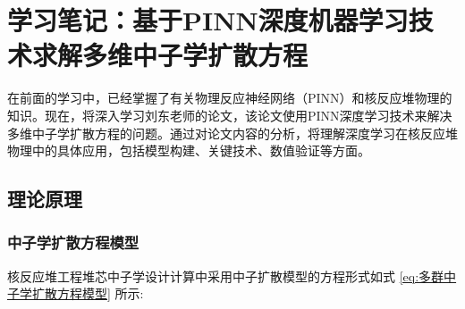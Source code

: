 \documentclass{Sichuan Normal University}
\begin{document}
\section{学习笔记：基于PINN深度机器学习技术求解多维中子学扩散方程}
在前面的学习中，已经掌握了有关物理反应神经网络（PINN）和核反应堆物理的知识。现在，将深入学习刘东老师的论文，该论文使用PINN深度学习技术来解决多维中子学扩散方程的问题。通过对论文内容的分析，将理解深度学习在核反应堆物理中的具体应用，包括模型构建、关键技术、数值验证等方面。
\subsection{理论原理}
\subsubsection{中子学扩散方程模型}
核反应堆工程堆芯中子学设计计算中采用中子扩散模型的方程形式如式 \eqref{eq:多群中子学扩散方程模型} 所示:
\end{document}
